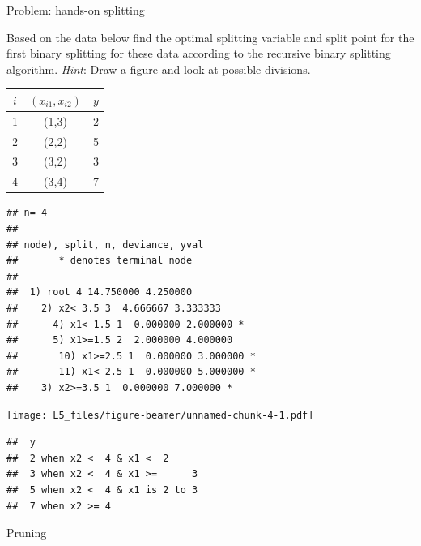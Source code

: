 \documentclass[
  ignorenonframetext,
]{beamer}
\begin{document}
\begin{frame}

\begin{block}{Problem: hands-on splitting}

Based on the data below find the optimal splitting variable and split
point for the first binary splitting for these data according to the
recursive binary splitting algorithm. \emph{Hint}: Draw a figure and
look at possible divisions.

\begin{longtable}[]{@{}ccc@{}}
\toprule
\(i\) & \((x_{i1},x_{i2})\) & \(y\)\tabularnewline
\midrule
\endhead
1 & (1,3) & 2\tabularnewline
2 & (2,2) & 5\tabularnewline
3 & (3,2) & 3\tabularnewline
4 & (3,4) & 7\tabularnewline
\bottomrule
\end{longtable}

\end{block}

\end{frame}

\begin{frame}[fragile]

\begin{verbatim}
## n= 4 
## 
## node), split, n, deviance, yval
##       * denotes terminal node
## 
##  1) root 4 14.750000 4.250000  
##    2) x2< 3.5 3  4.666667 3.333333  
##      4) x1< 1.5 1  0.000000 2.000000 *
##      5) x1>=1.5 2  2.000000 4.000000  
##       10) x1>=2.5 1  0.000000 3.000000 *
##       11) x1< 2.5 1  0.000000 5.000000 *
##    3) x2>=3.5 1  0.000000 7.000000 *
\end{verbatim}

\texttt{[image: L5\_files/figure-beamer/unnamed-chunk-4-1.pdf]}

\begin{verbatim}
##  y                            
##  2 when x2 <  4 & x1 <  2     
##  3 when x2 <  4 & x1 >=      3
##  5 when x2 <  4 & x1 is 2 to 3
##  7 when x2 >= 4
\end{verbatim}

\end{frame}

\begin{frame}

\begin{block}{Pruning}

\end{block}

\end{frame}
\end{document}
